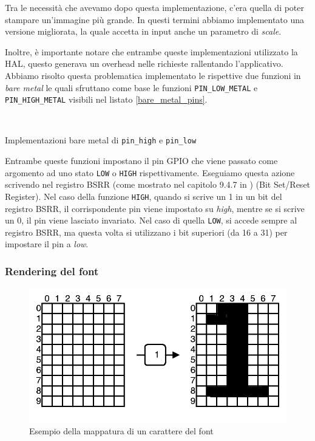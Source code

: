 \documentclass[a4paper]{article}
\begin{document}
Tra le necessità che avevamo dopo questa implementazione, c'era quella di poter stampare
un'immagine più grande. In questi termini abbiamo implementato una versione migliorata,
la quale accetta in input anche un parametro di \textit{scale}.

Inoltre, è importante notare che entrambe queste implementazioni utilizzato la HAL, questo
generava un overhead nelle richieste rallentando l'applicativo. Abbiamo risolto questa
problematica implementato le rispettive due funzioni in \textit{bare metal} le quali
sfruttano come base le funzioni \texttt{PIN\_LOW\_METAL} e \texttt{PIN\_HIGH\_METAL}
visibili nel listato \ref{bare_metal_pins}.

\begin{Listing}
    \centering
    \mbox{
        \quad
    }
    \caption{Implementazioni bare metal di \texttt{pin\_high} e \texttt{pin\_low}}
    \label{bare_metal_pins}
\end{Listing}

Entrambe queste funzioni impostano il pin GPIO che viene passato come argomento ad
uno stato \texttt{LOW} o \texttt{HIGH} rispettivamente.  Eseguiamo questa azione scrivendo
nel registro BSRR (come mostrato nel capitolo 9.4.7 in \cite{STM32F334xx}) (Bit Set/Reset Register).
Nel caso della funzione \texttt{HIGH}, quando si scrive un 1 in un bit del registro BSRR,
il corrispondente pin viene impostato su \textit{high}, mentre se si scrive un 0, il pin viene
lasciato invariato. Nel caso di quella \texttt{LOW}, si accede sempre al registro BSRR,
ma questa volta si utilizzano i bit superiori (da 16 a 31) per impostare il pin a \textit{low}.

\subsubsection{Rendering del font}

\begin{figure}[h!t]
    \begin{center}
        \includegraphics[scale=0.5]{./figures/matrix_font.pdf}
    \end{center}
    \caption{Esempio della mappatura di un carattere del font}
    \label{fig:matrix_font}
\end{figure}
\end{document}
